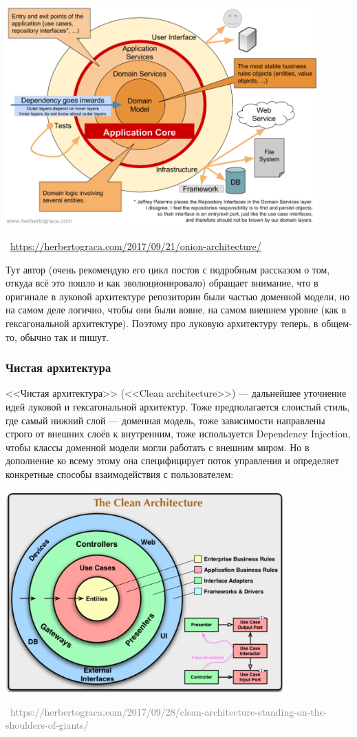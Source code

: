 \documentclass[a5paper]{article}
\newcommand{\attribution}[1] {
    \vspace{-4mm}\begin{flushright}\begin{scriptsize}\textcolor{gray}
    {\textcopyright\, #1}\end{scriptsize}\end{flushright}
}
\begin{document}
\begin{center}
    \includegraphics[width=0.9\textwidth]{onionArchitectureDetails.png}
    \attribution{\url{https://herbertograca.com/2017/09/21/onion-architecture/}}
\end{center}

Тут автор (очень рекомендую его цикл постов с подробным рассказом о том, откуда всё это пошло и как эволюционировало) обращает внимание, что в оригинале в луковой архитектуре репозитории были частью доменной модели, но на самом деле логично, чтобы они были вовне, на самом внешнем уровне (как в гексагональной архитектуре). Поэтому про луковую архитектуру теперь, в общем-то, обычно так и пишут.

\subsubsection{Чистая архитектура}

<<Чистая архитектура>> (<<Clean architecture>>) --- дальнейшее уточнение идей луковой и гексагональной архитектур. Тоже предполагается слоистый стиль, где самый нижний слой --- доменная модель, тоже зависимости направлены строго от внешних слоёв к внутренним, тоже используется Dependency Injection, чтобы классы доменной модели могли работать с внешним миром. Но в дополнение ко всему этому она специфицирует поток управления и определяет конкретные способы взаимодействия с пользователем:

\begin{center}
    \includegraphics[width=0.8\textwidth]{cleanArchitecture.png}
    \attribution{https://herbertograca.com/2017/09/28/clean-architecture-standing-on-the-shoulders-of-giants/}
\end{center}
\end{document}
